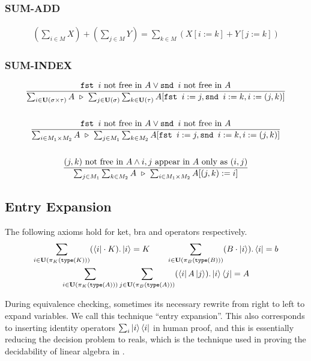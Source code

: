 \subsubsection*{SUM-ADD}
\begin{gather*}
  (\sum_{i \in M} X) + (\sum_{j \in M} Y) = \sum_{k \in M} (X[i:=k] + Y[j:=k])
\end{gather*}

\subsubsection*{SUM-INDEX}
\begin{gather*}
  \frac{\texttt{fst } i \text{ not free in } A \vee \texttt{snd } i \text{ not free in } A}{\sum_{i\in\mathbf{U}(\sigma \times \tau)}A \ \triangleright\  \sum_{j\in\mathbf{U}(\sigma)}\sum_{k\in\mathbf{U}(\tau)}A[\texttt{fst } i:=j, \texttt{snd } i:=k, i:=(j,k)]}
  \\
  \\
  \frac{\texttt{fst } i \text{ not free in } A \vee \texttt{snd } i \text{ not free in } A}{\sum_{i\in M_1 \times M_2}A \ \triangleright\  \sum_{j\in M_1}\sum_{k\in M_2}A[\texttt{fst } i:=j, \texttt{snd } i:=k, i:=(j,k)]}
  \\
  \\
  \frac{(j, k) \text{ not free in } A \wedge i, j \text{ appear in } A \text{ only as } (i, j)}{\sum_{j\in M_1}\sum_{k\in M_2}A \ \triangleright\  \sum_{i\in M_1\times M_2}A[(j,k):=i]}
\end{gather*}

\subsection{Entry Expansion}

The following axioms hold for ket, bra and operators respectively. 
\begin{gather*}
  \sum_{i \in \mathbf{U}(\pi_K(\texttt{type}(K)))} (\bra{i} \cdot K).\ket{i} = K
  \qquad
  \sum_{i \in \mathbf{U}(\pi_B(\texttt{type}(B)))} (B \cdot \ket{i}).\bra{i} = b
  \\
  \sum_{i \in \mathbf{U}(\pi_K(\texttt{type}(A)))} \sum_{j \in \mathbf{U}(\pi_B(\texttt{type}(A)))} (\bra{i} A \ket{j}).\ket{i}\bra{j} = A
\end{gather*}

During equivalence checking, sometimes its necessary rewrite from right to left to expand variables. We call this technique ``entry expansion''. This also corresponds to inserting identity operators $\sum_{i}\ket{i}\bra{i}$ in human proof, and this is essentially reducing the decision problem to reals, which is the technique used in proving the decidability of linear algebra in \cite{Solovay2012}.

